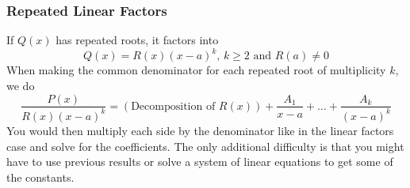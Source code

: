 \subsubsection{Repeated Linear Factors}
\noindent
If $Q(x)$ has repeated roots, it factors into
\begin{equation*}
	Q(x) = R(x)(x-a)^k\text{, }k \geq 2\text{ and }R(a) \neq 0
\end{equation*}
When making the common denominator for each repeated root of multiplicity $k$, we do
\begin{equation*}
	\frac{P(x)}{R(x)(x-a)^k} = \left(\text{Decomposition of }R(x)\right) + \frac{A_1}{x-a}+\ldots+\frac{A_k}{(x-a)^k}
\end{equation*}
You would then multiply each side by the denominator like in the linear factors case and solve for the coefficients. The only additional difficulty is that you might have to use previous results or solve a system of linear equations to get some of the constants.

\ifodd{}\fi